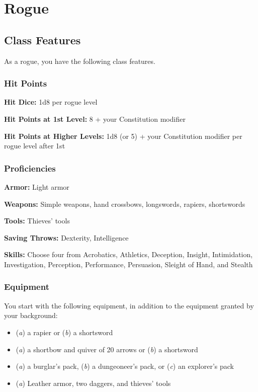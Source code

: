 \section{Rogue}
\label{cls:rogue}
\subsection{Class Features}

As a rogue, you have the following class features.

\subsubsection{Hit Points}

\textbf{Hit Dice:} 1d8 per rogue level

\textbf{Hit Points at 1st Level:} 8 + your Constitution modifier

\textbf{Hit Points at Higher Levels:} 1d8 (or 5) + your Constitution modifier per rogue level after 1st

\subsubsection{Proficiencies}

\textbf{Armor:} Light armor

\textbf{Weapons:} Simple weapons, hand crossbows, longswords, rapiers, shortswords

\textbf{Tools:} Thieves’ tools

\textbf{Saving Throws:} Dexterity, Intelligence

\textbf{Skills:} Choose four from Acrobatics, Athletics, Deception, Insight, Intimidation, Investigation, Perception, Performance, Persuasion, Sleight of Hand, and Stealth

\subsubsection{Equipment}

You start with the following equipment, in addition to the equipment granted by your background:
\begin{itemize}
	\item (\textit{a}) a rapier or (\textit{b}) a shortsword
	\item (\textit{a}) a shortbow and quiver of 20 arrows or (\textit{b}) a shortsword
	\item (\textit{a}) a burglar’s pack, (\textit{b}) a dungeoneer’s pack, or (\textit{c}) an explorer’s pack
  \item (\textit{a}) Leather armor, two daggers, and thieves’ tools
\end{itemize}

